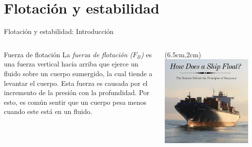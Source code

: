 \documentclass [xcolor=svgnames, t] {beamer}
\begin{document}
\section{Flotaci\'on y estabilidad}
\begin{frame}{Flotaci\'on y estabilidad: Introducci\'on}
\begin{columns}
\begin{block}{Fuerza de flotaci\'on}
La \emph{fuerza de flotaci\'on ($F_B$)} es una fuerza vertical hacia arriba que ejerce un fluido sobre un cuerpo sumergido, la cual tiende a levantar el cuerpo. Esta fuerza es causada por el incremento de la presi\'on con la profundidad. Por esto, es com\'un sentir que un cuerpo pesa menos cuando este est\'a en un fluido.
\end{block}
\begin{textblock*}{6cm}(6.5cm,2cm) %
\includegraphics[width=\textwidth]{buoy}
\end{textblock*}
\end{columns}
\end{frame}
\end{document}
